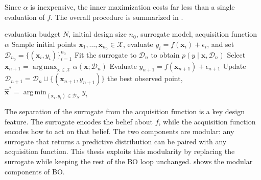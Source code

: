 
Since $\alpha$ is inexpensive, the inner maximization costs far less than a single evaluation of $f$. The overall procedure is summarized in .

\begin{algorithm}[t]
  \caption{Bayesian Optimization}
  \label{alg:bo}
  \begin{algorithmic}[1]
    \Require evaluation budget $N$, initial design size $n_0$, surrogate model, acquisition function $\alpha$
    \State Sample initial points $\boldsymbol{x}_1, \dots, \boldsymbol{x}_{n_0} \in \mathcal{X}$, evaluate $y_i = f(\boldsymbol{x}_i) + \epsilon_i$, and set $\mathcal{D}_{n_0} = \{(\boldsymbol{x}_i, y_i)\}_{i=1}^{n_0}$
      \State Fit the surrogate to $\mathcal{D}_n$ to obtain $p(y \mid \boldsymbol{x}, \mathcal{D}_n)$
      \State Select $\boldsymbol{x}_{n+1} = \operatorname*{arg\,max}_{\boldsymbol{x} \in \mathcal{X}} \alpha(\boldsymbol{x}; \mathcal{D}_n)$
      \State Evaluate $y_{n+1} = f(\boldsymbol{x}_{n+1}) + \epsilon_{n+1}$
      \State Update $\mathcal{D}_{n+1} = \mathcal{D}_n \cup \{(\boldsymbol{x}_{n+1}, y_{n+1})\}$
    \EndFor
    \Ensure the best observed point, $\hat{\boldsymbol{x}}^* = \operatorname*{arg\,min}_{(\boldsymbol{x}_i, y_i) \in \mathcal{D}_N} y_i$
  \end{algorithmic}
\end{algorithm}

The separation of the surrogate from the acquisition function is a key design feature. The surrogate encodes the belief about $f$, while the acquisition function encodes how to act on that belief. The two components are modular: any surrogate that returns a predictive distribution can be paired with any acquisition function. This thesis exploits this modularity by replacing the surrogate while keeping the rest of the BO loop unchanged.  shows the modular components of BO.

